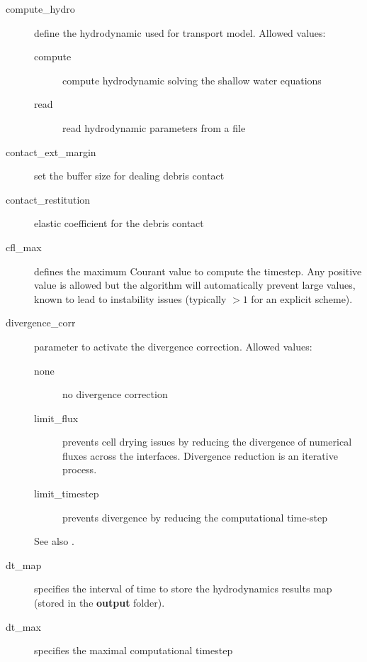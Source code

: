 \begin{description}
\item[compute\_hydro]  define the hydrodynamic used for transport model. Allowed values:
\begin{description}
    \item[compute] compute hydrodynamic solving the shallow water equations
    \item[read] read hydrodynamic parameters from a file
\end{description}

\item[contact\_ext\_margin]  set the buffer size for dealing debris contact

\item[contact\_restitution]  elastic coefficient for the debris contact

\item[cfl\_max] defines the maximum Courant value to compute the timestep. Any positive value is allowed but the algorithm will automatically prevent large values, known to lead to instability issues (typically  $> 1$ for an explicit scheme).

\item[divergence\_corr] parameter to activate the divergence correction. Allowed values:
\begin{description}
    \item[none] no divergence correction
    \item[limit\_flux] prevents cell drying issues by reducing the divergence of numerical fluxes across the interfaces. Divergence reduction is an iterative process. %
    \item[limit\_timestep] prevents divergence by reducing the computational time-step
\end{description}
See also .
\item[dt\_map] specifies the interval of time to store the hydrodynamics results map (stored in the \textbf{output} folder).

\item[dt\_max] specifies the maximal computational timestep


\end{description}
